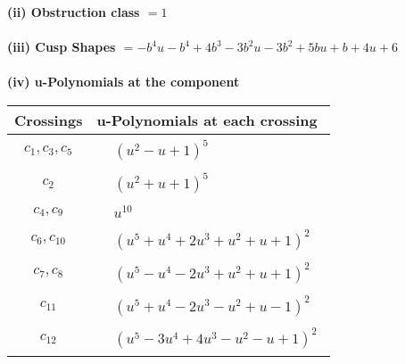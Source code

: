 \documentclass[1p]{elsarticle_modified}
\theoremstyle{definition}
\begin{document}
\flushleft \textbf{(ii) Obstruction class $= 1$}\\~\\
\flushleft \textbf{(iii) Cusp Shapes $= - b^4 u- b^4+4 b^3-3 b^2 u-3 b^2+5 b u+b+4 u+6$}\\~\\
\newpage\renewcommand{\arraystretch}{1}
\flushleft \textbf{(iv) u-Polynomials at the component}\newline \\
\begin{tabular}{m{50pt}|m{274pt}}
Crossings & \hspace{64pt}u-Polynomials at each crossing \\
\hline $$\begin{aligned}c_{1},c_{3},c_{5}\end{aligned}$$&$\begin{aligned}
&(u^2- u+1)^5
\end{aligned}$\\
\hline $$\begin{aligned}c_{2}\end{aligned}$$&$\begin{aligned}
&(u^2+u+1)^5
\end{aligned}$\\
\hline $$\begin{aligned}c_{4},c_{9}\end{aligned}$$&$\begin{aligned}
&u^{10}
\end{aligned}$\\
\hline $$\begin{aligned}c_{6},c_{10}\end{aligned}$$&$\begin{aligned}
&(u^5+u^4+2 u^3+u^2+u+1)^2
\end{aligned}$\\
\hline $$\begin{aligned}c_{7},c_{8}\end{aligned}$$&$\begin{aligned}
&(u^5- u^4-2 u^3+u^2+u+1)^2
\end{aligned}$\\
\hline $$\begin{aligned}c_{11}\end{aligned}$$&$\begin{aligned}
&(u^5+u^4-2 u^3- u^2+u-1)^2
\end{aligned}$\\
\hline $$\begin{aligned}c_{12}\end{aligned}$$&$\begin{aligned}
&(u^5-3 u^4+4 u^3- u^2- u+1)^2
\end{aligned}$\\
\hline
\end{tabular}\\~\\
\end{document}
